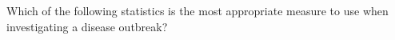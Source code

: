Which of the following statistics is the most appropriate measure to use when investigating a disease outbreak?
\begin{MultipleChoice}[itemname=II-6]
\end{MultipleChoice}
